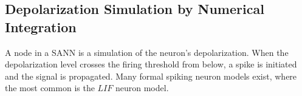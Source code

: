 









\subsection{Depolarization Simulation by Numerical Integration}
	A node in a SANN is a simulation of the neuron's depolarization.
	When the depolarization level crosses the firing threshold from below, a spike is initiated and the signal is propagated.
	Many formal spiking neuron models exist, where the most common is the $LIF$ neuron model\cite{florian03}. %
	
